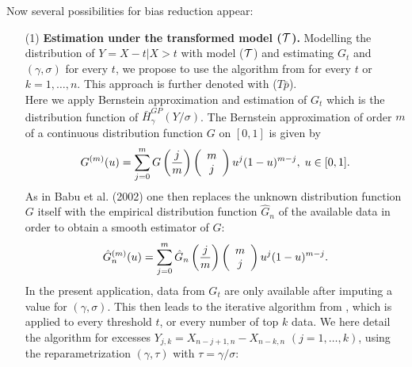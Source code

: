 \noindent Now several possibilities for bias reduction appear:
\begin{enumerate}
\item[(1)] {\bf Estimation under the transformed model (${\cal T}$).} Modelling the distribution of $Y=X-t|X>t$
with model ($\cal{T}$) 
and estimating $G_t$ and $(\gamma,\sigma)$ for every $t$, we propose to use the algorithm from \cite{tencaliec2018flexible} for every $t$ or $k=1,\ldots,n$. This approach is further denoted with ($T\bar{p}$). \\
 Here we apply Bernstein approximation and estimation of $G_t$ which is the distribution function of $\bar{H}_{\gamma}^{GP}(Y/\sigma)$. 
The Bernstein approximation of order $m$ of a continuous distribution function $G$ on $[0,1]$
is given by 
\[
G^{(m)}(u) = \sum_{j=0}^m G\left( {j \over m}\right)\left( \begin{array}{c} m \\ j \end{array}\right)u^j (1-u)^{m-j},
\; u \in [0,1].
\]
As in Babu et al. (2002) one then replaces the unknown distribution function $G$ itself with the empirical distribution function $\hat{G}_n$ of the available data in order to obtain a smooth estimator of $G$:
\[
\hat{G}_n^{(m)}(u) = \sum_{j=0}^m \hat{G}_n\left( {j \over m}\right)\left( \begin{array}{c} m \\ j \end{array}\right)u^j (1-u)^{m-j}. 
\] 
In the present application, data from $G_t$ are only available after imputing a value for $(\gamma,\sigma)$. This then leads to the iterative algorithm from \cite{tencaliec2018flexible}, which is applied to every threshold $t$, or every number of top $k$ data. We here detail the algorithm for excesses $Y_{j,k}=X_{n-j+1,n}-X_{n-k,n}$ $(j=1,\ldots,k)$, using the reparametrization $(\gamma,\tau)$ with $\tau=\gamma/\sigma$:


\end{enumerate}
